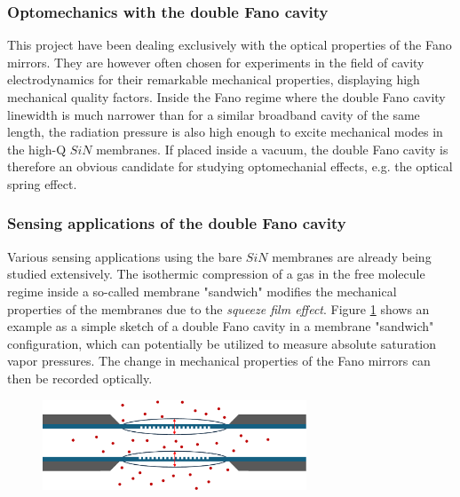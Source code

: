 \subsubsection{Optomechanics with the double Fano cavity}

This project have been dealing exclusively with the optical properties of the Fano mirrors. They are however often chosen for experiments in the field of cavity electrodynamics for their remarkable mechanical properties, displaying high mechanical quality factors. Inside the Fano regime where the double Fano cavity linewidth is much narrower than for a similar broadband cavity of the same length, the radiation pressure is also high enough to excite mechanical modes in the high-Q $SiN$ membranes. If placed inside a vacuum, the double Fano cavity is therefore an obvious candidate for studying optomechanial effects, e.g. the optical spring effect\cite{Manjeshwar}.

\subsubsection{Sensing applications of the double Fano cavity}

Various sensing applications using the bare $SiN$ membranes are already being studied extensively. The isothermic compression of a gas in the free molecule regime inside a so-called membrane "sandwich" modifies the mechanical properties of the membranes due to the \emph{squeeze film effect}. Figure \ref{fig:squeeze_film_pressure_sensor_sketch} shows an example as a simple sketch of a double Fano cavity in a membrane "sandwich" configuration, which can potentially be utilized to measure absolute saturation vapor pressures\cite{Salimi}. The change in mechanical properties of the Fano mirrors can then be recorded optically\cite{Al-Sumaidae,Hornig}. 

\begin{figure}[h!]
    \centering
    \includegraphics[width=0.7\textwidth]{figures/squeeze_film_pressure_sensor_sketch.pdf}
    \caption{}
    \label{fig:squeeze_film_pressure_sensor_sketch}
\end{figure}

